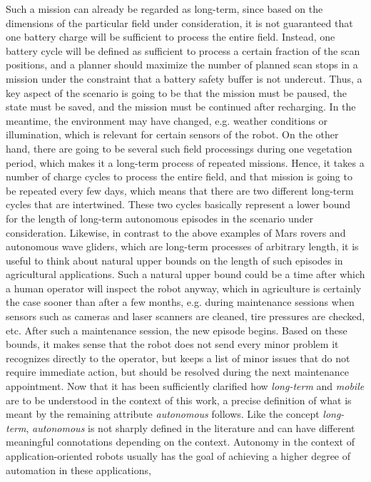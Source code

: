 \documentclass[english, master, utf8]{base/thesis_KBS}
\begin{document}
Such a mission can already be regarded as long-term, since based on the dimensions of the particular field under consideration, it is not guaranteed that one
battery charge will be sufficient to process the entire field. Instead, one battery cycle will be defined as sufficient to process a certain fraction of the scan
positions, and a planner should maximize the number of planned scan stops in a mission under the constraint that a battery safety buffer is not undercut.
Thus, a key aspect of the scenario is going to be that the mission must be paused, the state must be saved, and the mission must be continued after recharging.
In the meantime, the environment may have changed, e.g. weather conditions or illumination, which is relevant for certain sensors of the robot.
On the other hand, there are going to be several such field processings during one vegetation period, which makes it a long-term process of repeated missions.
Hence, it takes a number of charge cycles to process the entire field, and that mission is going to be repeated every few days,
which means that there are two different long-term cycles that are intertwined.
These two cycles basically represent a lower bound for the length of long-term autonomous episodes in the scenario under
consideration. Likewise, in contrast to the above examples of Mars rovers and autonomous wave gliders, which are long-term
processes of arbitrary length, it is useful to think about natural upper bounds on the length of such episodes in agricultural
applications. Such a natural upper bound could be a time after which a human operator will inspect the robot anyway,
which in agriculture is certainly the case sooner than after a few months, e.g. during maintenance sessions 
when sensors such as cameras and laser scanners are cleaned, tire pressures are checked, etc.
After such a maintenance session, the new episode begins. 
Based on these bounds, it makes sense that the robot does not send every minor problem it recognizes directly to the operator,
but keeps a list of minor issues that do not require immediate action, but should be resolved during the next maintenance
appointment.\newline
Now that it has been sufficiently clarified how \textit{long-term} and \textit{mobile} are to be understood in the context of this work,
a precise definition of what is meant by the remaining attribute \textit{autonomous} follows.
Like the concept \textit{long-term}, \textit{autonomous} is not sharply defined in the literature and can have different meaningful connotations depending
on the context. Autonomy in the context of application-oriented robots usually has the goal of achieving a higher degree of automation in these applications,
\end{document}

